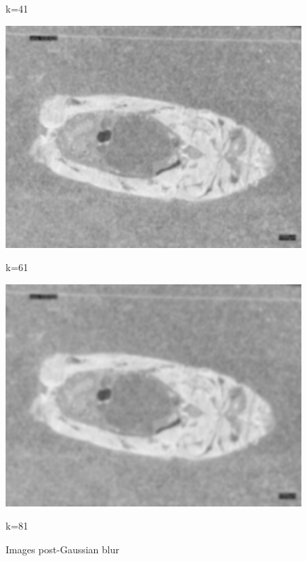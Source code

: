 \begin{figure}
\begin{minipage}{0.24\textwidth}
        \caption*{k=41}
    \end{minipage}
    \begin{minipage}{0.24\textwidth}
        \centering
        \includegraphics[width=\textwidth]{./fig/gausssian/blurred61.jpg}
        \caption*{k=61}
    \end{minipage}
    \begin{minipage}{0.24\textwidth}
        \centering
        \includegraphics[width=\textwidth]{./fig/gausssian/blurred81.jpg}
        \caption*{k=81}
    \end{minipage}
    \caption{Images post-Gaussian blur}
    \label{fig:blurred}
\end{figure}

